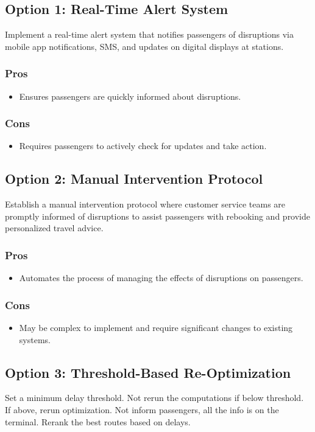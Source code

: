 \subsection*{Option 1: Real-Time Alert System}
Implement a real-time alert system that notifies passengers of disruptions via mobile app notifications, SMS, and updates on digital displays at stations.
\subsubsection*{Pros}
\begin{itemize}
    \item Ensures passengers are quickly informed about disruptions.
\end{itemize}
\subsubsection*{Cons}
\begin{itemize}
    \item Requires passengers to actively check for updates and take action.
\end{itemize}

\subsection*{Option 2: Manual Intervention Protocol}
Establish a manual intervention protocol where customer service teams are promptly informed of disruptions to assist passengers with rebooking and provide personalized travel advice.
\subsubsection*{Pros}
\begin{itemize}
    \item Automates the process of managing the effects of disruptions on passengers.
\end{itemize}
\subsubsection*{Cons}
\begin{itemize}
    \item May be complex to implement and require significant changes to existing systems.
\end{itemize}

\subsection*{Option 3: Threshold-Based Re-Optimization}
Set a minimum delay threshold. Not rerun the computations if below threshold. If above, rerun optimization. Not inform passengers, all the info is on the terminal. Rerank the best routes based on delays.

